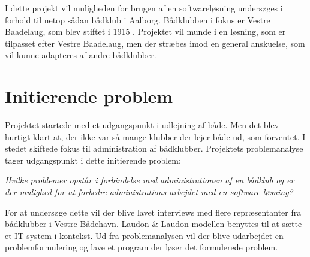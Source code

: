 I dette projekt vil muligheden for brugen af en softwareløsning undersøges i forhold til netop sådan bådklub i Aalborg. Bådklubben i fokus er Vestre Baadelaug, som blev stiftet i 1915 \cite{vb_historie}. Projektet vil munde i en løsning, som er tilpasset efter Vestre Baadelaug, men der stræbes imod en general anskuelse, som vil kunne adapteres af andre bådklubber.





\section{Initierende problem}
\label{initierende}
Projektet startede med et udgangspunkt i udlejning af både. Men det blev hurtigt klart at, der ikke var så mange klubber der lejer både ud, som forventet. I stedet skiftede fokus til administration af bådklubber. Projektets problemanalyse tager udgangspunkt i dette initierende problem:

\textit{Hvilke problemer opstår i forbindelse med administrationen af en bådklub og er der mulighed for at forbedre administrations arbejdet med en software løsning?}

For at undersøge dette vil der blive lavet interviews med flere repræsentanter fra bådklubber i Vestre Bådehavn. Laudon \& Laudon modellen benyttes til at sætte et IT system i kontekst. Ud fra problemanalysen vil der blive udarbejdet en problemformulering og lave et program der løser det formulerede problem.
